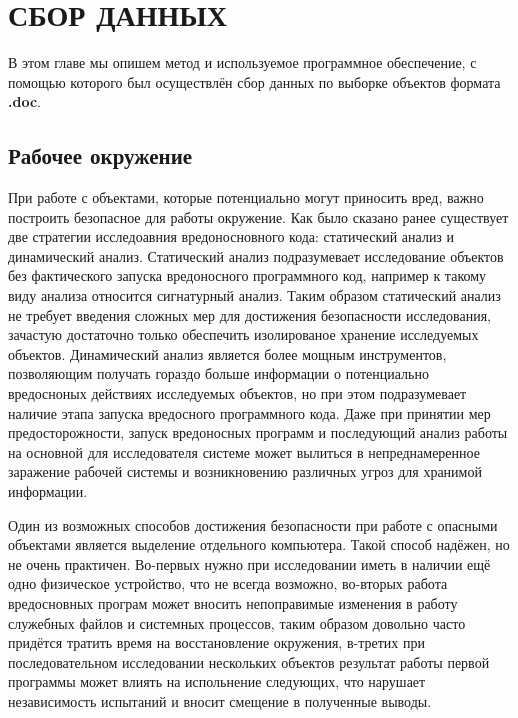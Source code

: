 \chapter{СБОР ДАННЫХ}

В этом главе мы опишем метод и используемое программное обеспечение, с помощью которого был осуществлён сбор данных по выборке объектов формата \textbf{.doc}.

\section{Рабочее окружение}

При работе с объектами, которые потенциально могут приносить вред, важно построить безопасное для работы окружение.
Как было сказано ранее существует две стратегии исследоавния вредоносновного кода: статический анализ и динамический анализ.
Статический анализ подразумевает исследование объектов без фактического запуска вредоносного программного код, например к такому виду анализа относится сигнатурный анализ.
Таким образом статический анализ не требует введения сложных мер для достижения безопасности исследования, зачастую достаточно только обеспечить изолированое хранение исследуемых объектов.
Динамический анализ является более мощным инструментов, позволяющим получать гораздо больше информации о потенциально вредосноных действиях исследуемых объектов, но при этом подразумевает наличие этапа запуска вредосного программного кода.
Даже при принятии мер предосторожности, запуск вредоносных программ и последующий анализ работы на основной для исследователя системе может вылиться в непреднамеренное заражение рабочей системы и возникновению различных угроз для хранимой информации.

Один из возможных способов достижения безопасности при работе с опасными объектами является выделение отдельного компьютера.
Такой способ надёжен, но не очень практичен. Во-первых нужно при исследовании иметь в наличии ещё одно физическое устройство, что не всегда возможно, во-вторых работа вредосновных програм может вносить непоправимые изменения в работу служебных файлов и системных процессов, таким образом довольно часто придётся тратить время на восстановление окружения, в-третих при последовательном исследовании нескольких объектов результат работы первой программы может влиять на испольнение следующих, что нарушает независимость испытаний и вносит смещение в полученные выводы.

